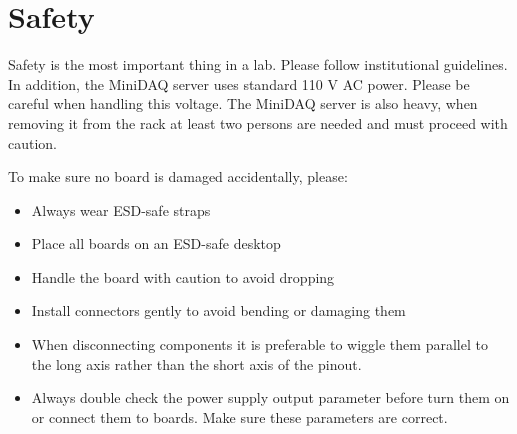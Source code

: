 \section{Safety}
Safety is the most important thing in a lab. Please follow institutional guidelines.
In addition, the MiniDAQ server uses standard 110 V AC power. Please be careful when handling this voltage.
The MiniDAQ server is also heavy, when removing it from the rack at least two
persons are needed and must proceed with caution.

To make sure no board is damaged accidentally, please:
\begin{itemize}
    \item Always wear ESD-safe straps
    \item Place all boards on an ESD-safe desktop
    \item Handle the board with caution to avoid dropping
    \item Install connectors gently to avoid bending or damaging them
    \item When disconnecting components it is preferable to wiggle them parallel to
    	the long axis rather than the short axis of the pinout.
    \item Always double check the power supply output parameter before turn them
        on or connect them to boards. Make sure these parameters are correct.
\end{itemize}
